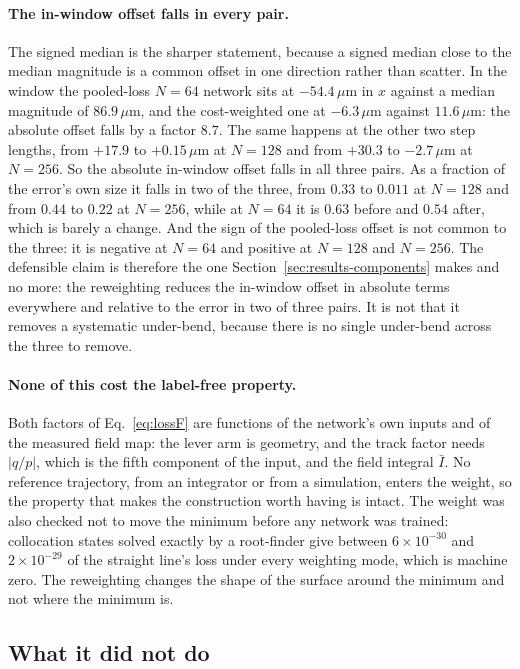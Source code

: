 \documentclass[11pt,a4paper]{article}
\newcommand{\um}{\ensuremath{\,\mu\mathrm{m}}}
\begin{document}
\paragraph{The in-window offset falls in every pair.} The signed median is the
sharper statement, because a signed median close to the median magnitude is a
common offset in one direction rather than scatter. In the window the
pooled-loss $N = 64$ network sits at $-54.4\um$ in $x$ against a median
magnitude of $86.9\um$, and the cost-weighted one at $-6.3\um$ against
$11.6\um$: the absolute offset falls by a factor $8.7$. The same happens at the
other two step lengths, from $+17.9$ to $+0.15\um$ at $N = 128$ and from
$+30.3$ to $-2.7\um$ at $N = 256$. So the absolute in-window offset falls in
all three pairs. As a fraction of the error's own size it falls in two of the
three, from $0.33$ to $0.011$ at $N = 128$ and from $0.44$ to $0.22$ at
$N = 256$, while at $N = 64$ it is $0.63$ before and $0.54$ after, which is
barely a change. And the sign of the pooled-loss offset is not common to the
three: it is negative at $N = 64$ and positive at $N = 128$ and $N = 256$. The
defensible claim is therefore the one Section~\ref{sec:results-components}
makes and no more: the reweighting reduces the in-window offset in absolute
terms everywhere and relative to the error in two of three pairs. It is not
that it removes a systematic under-bend, because there is no single under-bend
across the three to remove.

\paragraph{None of this cost the label-free property.} Both factors of
Eq.~\eqref{eq:lossF} are functions of the network's own inputs and of the
measured field map: the lever arm is geometry, and the track factor needs
$|q/p|$, which is the fifth component of the input, and the field integral
$\bar{I}$. No reference trajectory, from an integrator or from a simulation,
enters the weight, so the property that makes the construction worth having is
intact. The weight was also checked not to move the minimum before any network
was trained: collocation states solved exactly by a root-finder give between
$6\times10^{-30}$ and $2\times10^{-29}$ of the straight line's loss under every
weighting mode, which is machine zero. The reweighting changes the shape of the
surface around the minimum and not where the minimum is.

\subsection{What it did not do}
\label{sec:discussion-didnot}
\end{document}
